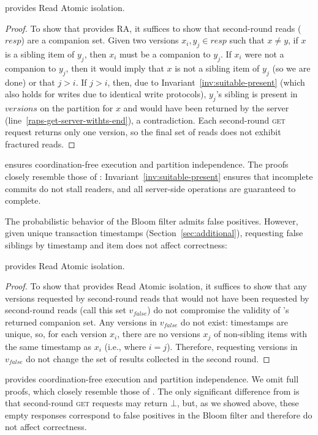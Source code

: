 \begin{claim}\raps provides Read Atomic isolation.\end{claim}
\begin{proof}
  To show that \raps provides RA, it suffices to show that \raps
  second-round reads ($resp$) are a companion set. Given two versions
  $x_i, y_j \in resp$ such that $x \neq y$, if $x$ is a sibling item
  of $y_j$, then $x_i$ must be a companion to $y_j$. If $x_i$ were not
  a companion to $y_j$, then it would imply that $x$ is not a sibling
  item of $y_j$ (so we are done) or that $j > i$. If $j > i$, then,
  due to Invariant~\ref{inv:suitable-present} (which also holds for
  \raps writes due to identical write protocols), $y_j$'s sibling is
  present in $versions$ on the partition for $x$ and would have been
  returned by the server (line~\ref{raps-get-server-withts-end}), a
  contradiction. Each second-round \textsc{get} request returns only
  one version, so the final set of reads does not exhibit fractured reads.
\end{proof}

 \raps ensures
coordination-free execution and partition independence. The proofs
closely resemble those of \rapl: Invariant~\ref{inv:suitable-present}
ensures that incomplete commits do not stall readers, and all
server-side operations are guaranteed to complete.

 The probabilistic behavior of the \rapb Bloom
filter admits false positives. However, given unique transaction
timestamps (Section~\ref{sec:additional}), requesting false siblings
by timestamp and item does not affect correctness:

\begin{claim}\rapb provides Read Atomic isolation.\end{claim}
\begin{proof}
To show that \rapb provides Read Atomic isolation, it suffices to show
that any versions requested by \rapb second-round reads that would not
have been requested by \rapl second-round reads (call this set
$v_{false}$) do not compromise the validity of \rapb's returned
companion set. Any versions in $v_{false}$ do not exist: timestamps
are unique, so, for each version $x_i$, there are no versions $x_j$ of
non-sibling items with the same timestamp as $x_i$ (i.e., where
$i=j$). Therefore, requesting versions in $v_{false}$ do not change
the set of results collected in the second round.
\end{proof}


 \rapb provides
coordination-free execution and partition independence. We omit full
proofs, which closely resemble those of \rapl. The only significant
difference from \rapl is that second-round \textsc{get} requests may
return $\bot$, but, as we showed above, these empty responses
correspond to false positives in the Bloom filter and therefore do not
affect correctness.

